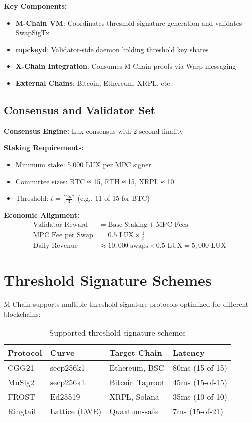 \documentclass[11pt]{article}
\begin{document}
\textbf{Key Components:}
\begin{itemize}
\item \textbf{M-Chain VM}: Coordinates threshold signature generation and validates SwapSigTx
\item \textbf{mpckeyd}: Validator-side daemon holding threshold key shares
\item \textbf{X-Chain Integration}: Consumes M-Chain proofs via Warp messaging
\item \textbf{External Chains}: Bitcoin, Ethereum, XRPL, etc.
\end{itemize}

\subsection{Consensus and Validator Set}

\textbf{Consensus Engine:} Lux consensus with 2-second finality

\textbf{Staking Requirements:}
\begin{itemize}
\item Minimum stake: 5,000 LUX per MPC signer
\item Committee sizes: BTC ≈ 15, ETH ≈ 15, XRPL ≈ 10
\item Threshold: $t = \lceil \frac{2n}{3} \rceil$ (e.g., 11-of-15 for BTC)
\end{itemize}

\textbf{Economic Alignment:}
\begin{align}
\text{Validator Reward} &= \text{Base Staking} + \text{MPC Fees} \\
\text{MPC Fee per Swap} &= 0.5 \text{ LUX} \times \frac{1}{t} \\
\text{Daily Revenue} &\approx 10{,}000 \text{ swaps} \times 0.5 \text{ LUX} = 5{,}000 \text{ LUX}
\end{align}

\section{Threshold Signature Schemes}

M-Chain supports multiple threshold signature protocols optimized for different blockchains:

\begin{table}[h]
\centering
\begin{tabular}{@{}llll@{}}
\toprule
\textbf{Protocol} & \textbf{Curve} & \textbf{Target Chain} & \textbf{Latency} \\
\midrule
CGG21 & secp256k1 & Ethereum, BSC & 80ms (15-of-15) \\
MuSig2 & secp256k1 & Bitcoin Taproot & 45ms (15-of-15) \\
FROST & Ed25519 & XRPL, Solana & 35ms (10-of-10) \\
Ringtail & Lattice (LWE) & Quantum-safe & 7ms (15-of-21) \\
\bottomrule
\end{tabular}
\caption{Supported threshold signature schemes}
\label{tab:threshold-schemes}
\end{table}
\end{document}
